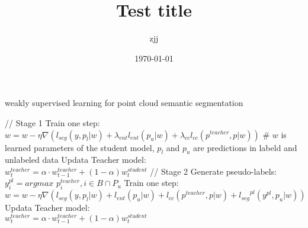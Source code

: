 \documentclass{article}
\title{Test title}
\author{ zjj }
\date{\today}
\begin{document}
\begin{algorithm} 
	\caption{ weakly supervised learning for point cloud semantic segmentation} 
	// Stage 1\;
	{ 
		{
			Train one step:\\
			$w = w - \eta \nabla (l_{seg}(y,p_{l}|w)+
			\lambda_{ent}l_{ent}(p_{u}|w)+
			\lambda_{cc}l_{cc}(p^{teacher},p|w))$\;
			\# $w$ is learned parameters of the student model, $p_{l}$ and $p_{u}$ are predictions in labeld and unlabeled data\;
			Updata Teacher model:\\
			$w^{teacher}_{t} = \alpha \cdot w^{teacher}_{t-1} + (1-\alpha)w^{student}_{t}$\;
		}
	} 
	// Stage 2\;
	{ 
		{
			Generate pseudo-labels:\\
			$y_{i}^{pl} = arg max$ ${p_{i}^{teacher}}, i \in B \cap P_{u}$\;
			Train one step:\\
			$w = w - \eta \nabla (l_{seg}(y,p_{l}|w)+
			l_{ent}(p_{u}|w)+ l_{cc}(p^{teacher},p|w)+ {l_{seg}}^{pl}(y^{pl},p_{u}|w))$\;
			Updata Teacher model:\\
			$w^{teacher}_{t} = \alpha \cdot w^{teacher}_{t-1} + (1-\alpha)w^{student}_{t}$\;
		}
	}
\end{algorithm}
\end{document}
